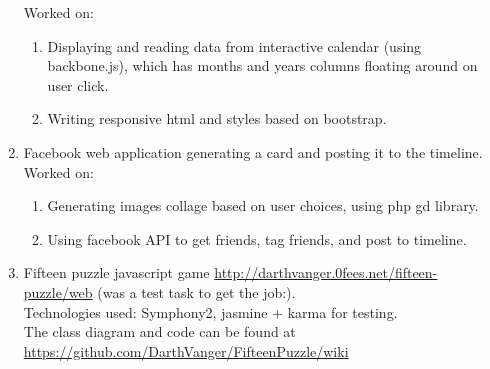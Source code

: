 \documentclass[a4paper, 14pt]{article}
\begin{document}
\begin{enumerate}
            Worked on:
            \begin{enumerate}
                \item Displaying and reading data from interactive calendar (using backbone.js), which has months and years columns floating around on user click.
                \item Writing responsive html and styles based on bootstrap.
            \end{enumerate}
        \item Facebook web application generating a card and posting it to the timeline.
            Worked on:
            \begin{enumerate}
                \item Generating images collage based on user choices, using php gd library.
                \item Using facebook API to get friends, tag friends, and post to timeline.
            \end{enumerate}
        \item Fifteen puzzle javascript game \url{http://darthvanger.0fees.net/fifteen-puzzle/web} (was a test task to get the job:). \\
            Technologies used: Symphony2, jasmine + karma for testing. \\
            The class diagram and code can be found at \\
            \url{https://github.com/DarthVanger/FifteenPuzzle/wiki}
    \end{enumerate}
\end{document}
